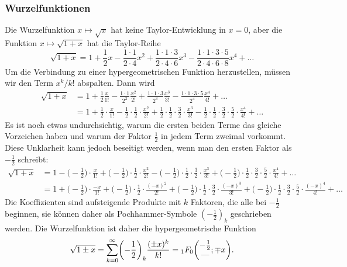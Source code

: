 \subsubsection{Wurzelfunktionen}
%
Die Wurzelfunktion $x\mapsto \sqrt{x}$ hat keine Taylor-Entwicklung
in $x=0$, aber die Funktion $x\mapsto\sqrt{1+x}$ hat die Taylor-Reihe
\[
\sqrt{1+x}
=
1
+
\frac12 x
-
\frac{1\cdot 1}{2\cdot 4}x^2
+
\frac{1\cdot 1\cdot 3}{2\cdot 4\cdot 6}x^3
-
\frac{1\cdot 1\cdot 3\cdot 5}{2\cdot 4\cdot 6\cdot 8}x^4
+
\dots
\]
Um die Verbindung zu einer hypergeometrischen Funktion herzustellen,
müssen wir den Term $x^k/k!$ abspalten.
Dann wird
\begin{align*}
\sqrt{1+x}
&=
1
+
\frac12 \frac{x}{1!}
-
\frac{1\cdot 1}{2^2}\frac{x^2}{2!}
+
\frac{1\cdot 1\cdot 3}{2^3}\frac{x^3}{3!}
-
\frac{1\cdot 1\cdot 3\cdot 5}{2^4}\frac{x^4}{4!}
+
\dots
\\
&=
1
+
\frac12 \cdot\frac{x}{1!}
-
\frac{1}{2}\cdot \frac{1}{2}\cdot\frac{x^2}{2!}
+
\frac{1}{2}\cdot \frac{1}2\cdot \frac{3}{2}\cdot\frac{x^3}{3!}
-
\frac{1}{2}\cdot \frac{1}{2}\cdot \frac{3}{2}\cdot \frac{5}{2}\cdot\frac{x^4}{4!}
+
\dots
\end{align*}
Es ist noch etwas undurchsichtig, warum die ersten beiden Terme
das gleiche Vorzeichen haben und warum der Faktor $\frac12$ in jedem
Term zweimal vorkommt.
Diese Unklarheit kann jedoch beseitigt werden, wenn man den ersten
Faktor als $-\frac12$ schreibt:
\begin{align*}
\sqrt{1+x}
&=
1
-
\biggl(-\frac12\biggr)\cdot\frac{x}{1!}
+
\biggl(-\frac{1}{2}\biggr)\cdot \frac{1}{2}\cdot\frac{x^2}{2!}
-
\biggl(-\frac{1}{2}\biggr)\cdot \frac{1}2\cdot \frac{3}{2}\cdot\frac{x^3}{3!}
+
\biggl(-\frac{1}{2}\biggr)\cdot \frac{1}{2}\cdot \frac{3}{2}\cdot \frac{5}{2}\cdot\frac{x^4}{4!}
+
\dots
\\
&=
1 + 
\biggl(-\frac12\biggr)\cdot\frac{-x}{1!}
+
\biggl(-\frac{1}{2}\biggr)\cdot \frac{1}{2}\cdot\frac{(-x)^2}{2!}
+
\biggl(-\frac{1}{2}\biggr)\cdot \frac{1}2\cdot \frac{3}{2}\cdot\frac{(-x)^3}{3!}
+
\biggl(-\frac{1}{2}\biggr)\cdot \frac{1}{2}\cdot \frac{3}{2}\cdot \frac{5}{2}\cdot\frac{(-x)^4}{4!}
+
\dots
\end{align*}
Die Koeffizienten sind aufsteigende Produkte mit $k$ Faktoren, die alle bei
$-\frac12$ beginnen, sie können daher als Pochhammer-Symbole $(-\frac12)_k$
geschrieben werden.
Die Wurzelfunktion ist daher die hypergeometrische Funktion
\[
\sqrt{1\pm x}
=
\sum_{k=0}^\infty
\biggl(-\frac12\biggr)_k \frac{(\pm x)^k}{k!}
=
\mathstrut_1F_0\biggl(
\begin{matrix}-\frac12\\\text{---}\end{matrix};\mp x
\biggr).
\]

